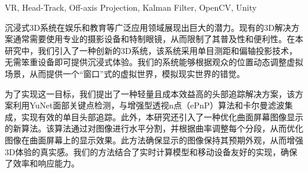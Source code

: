 \begin{中文摘要}{VR, Head-Track, Off-axis Projection, Kalman Filter, OpenCV, Unity}



沉浸式3D系统在娱乐和教育等广泛应用领域展现出巨大的潜力。现有的3D解决方案通常需要使用专业的摄影设备和特制眼镜，从而限制了其普及性和便利性。在本研究中，我们引入了一种创新的3D系统，该系统采用单目测距和偏轴投影技术，无需笨重设备即可提供沉浸式体验。我们的系统能够根据观众的位置动态调整虚拟场景，从而提供一个“窗口”式的虚拟世界，模拟现实世界的错觉。

为了实现这一目标，我们提出了一种轻量且成本效益高的头部追踪解决方案，该方案利用YuNet面部关键点检测，与增强型透视n点（ePnP）算法和卡尔曼滤波集成，实现有效的单目头部追踪。此外，本研究还引入了一种优化曲面屏幕图像显示的新算法。该算法通过对图像进行水平分割，并根据曲率调整每个分段，从而优化图像在曲面屏幕上的显示效果。此方法确保显示的图像保持其预期外观，从而增强3D体验的真实感。我们的方法结合了实时计算模型和移动设备友好的实现，确保了效率和响应能力。


\end{中文摘要}
